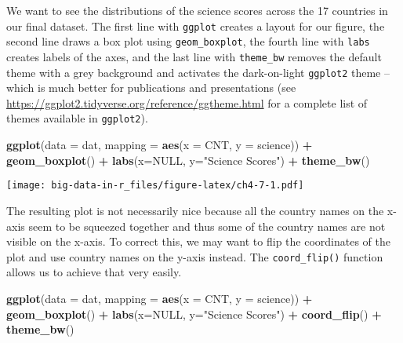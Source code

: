\documentclass[]{book}
\newenvironment{Shaded}{\begin{snugshade}}{\end{snugshade}}
\newcommand{\DataTypeTok}[1]{\textcolor[rgb]{0.13,0.29,0.53}{#1}}
\newcommand{\KeywordTok}[1]{\textcolor[rgb]{0.13,0.29,0.53}{\textbf{#1}}}
\newcommand{\NormalTok}[1]{#1}
\newcommand{\OperatorTok}[1]{\textcolor[rgb]{0.81,0.36,0.00}{\textbf{#1}}}
\newcommand{\OtherTok}[1]{\textcolor[rgb]{0.56,0.35,0.01}{#1}}
\newcommand{\StringTok}[1]{\textcolor[rgb]{0.31,0.60,0.02}{#1}}
\begin{document}
We want to see the distributions of the science scores across the 17 countries in our final dataset. The first line with \texttt{ggplot} creates a layout for our figure, the second line draws a box plot using \texttt{geom\_boxplot}, the fourth line with \texttt{labs} creates labels of the axes, and the last line with \texttt{theme\_bw} removes the default theme with a grey background and activates the dark-on-light \texttt{ggplot2} theme -- which is much better for publications and presentations (see \url{https://ggplot2.tidyverse.org/reference/ggtheme.html} for a complete list of themes available in \texttt{ggplot2}).

\begin{Shaded}
\begin{Highlighting}[]
\KeywordTok{ggplot}\NormalTok{(}\DataTypeTok{data =}\NormalTok{ dat, }\DataTypeTok{mapping =} \KeywordTok{aes}\NormalTok{(}\DataTypeTok{x =}\NormalTok{ CNT, }\DataTypeTok{y =}\NormalTok{ science)) }\OperatorTok{+}
\StringTok{  }\KeywordTok{geom_boxplot}\NormalTok{() }\OperatorTok{+}
\StringTok{  }\KeywordTok{labs}\NormalTok{(}\DataTypeTok{x=}\OtherTok{NULL}\NormalTok{, }\DataTypeTok{y=}\StringTok{"Science Scores"}\NormalTok{) }\OperatorTok{+}
\StringTok{  }\KeywordTok{theme_bw}\NormalTok{()}
\end{Highlighting}
\end{Shaded}

\texttt{[image: big-data-in-r\_files/figure-latex/ch4-7-1.pdf]}

The resulting plot is not necessarily nice because all the country names on the x-axis seem to be squeezed together and thus some of the country names are not visible on the x-axis. To correct this, we may want to flip the coordinates of the plot and use country names on the y-axis instead. The \texttt{coord\_flip()} function allows us to achieve that very easily.

\begin{Shaded}
\begin{Highlighting}[]
\KeywordTok{ggplot}\NormalTok{(}\DataTypeTok{data =}\NormalTok{ dat,}
       \DataTypeTok{mapping =} \KeywordTok{aes}\NormalTok{(}\DataTypeTok{x =}\NormalTok{ CNT, }\DataTypeTok{y =}\NormalTok{ science)) }\OperatorTok{+}
\StringTok{  }\KeywordTok{geom_boxplot}\NormalTok{() }\OperatorTok{+}
\StringTok{  }\KeywordTok{labs}\NormalTok{(}\DataTypeTok{x=}\OtherTok{NULL}\NormalTok{, }\DataTypeTok{y=}\StringTok{"Science Scores"}\NormalTok{) }\OperatorTok{+}
\StringTok{  }\KeywordTok{coord_flip}\NormalTok{() }\OperatorTok{+}
\StringTok{  }\KeywordTok{theme_bw}\NormalTok{()}
\end{Highlighting}
\end{Shaded}
\end{document}
